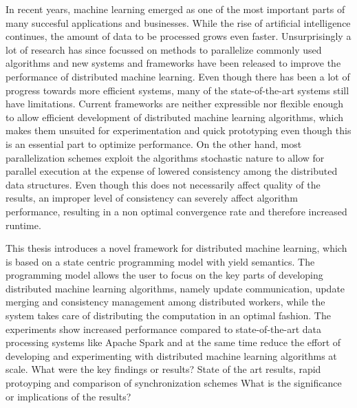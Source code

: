 % 
% 
%
In recent years, machine learning emerged as one of the most important parts of many succesful applications and businesses.
While the rise of artificial intelligence continues, the amount of data to be processed grows even faster.
Unsurprisingly a lot of research has since focussed on methods to parallelize commonly used algorithms and new systems and frameworks have been released to improve the performance of distributed machine learning.
Even though there has been a lot of progress towards more efficient systems, many of the state-of-the-art systems still have limitations.
Current frameworks are neither expressible nor flexible enough to allow efficient development of distributed machine learning algorithms, which makes them unsuited for experimentation and quick prototyping even though this is an essential part to optimize performance.
On the other hand, most parallelization schemes exploit the algorithms stochastic nature to allow for parallel execution at the expense of lowered consistency among the distributed data structures.
Even though this does not necessarily affect quality of the results, an improper level of consistency can severely affect algorithm performance, resulting in a non optimal convergence rate and therefore increased runtime.

This thesis introduces a novel framework for distributed machine learning, which is based on a state centric programming model with yield semantics.
The programming model allows the user to focus on the key parts of developing distributed machine learning algorithms, namely update communication, update merging and consistency management among distributed workers, while the system takes care of distributing the computation in an optimal fashion.
The experiments show increased performance compared to state-of-the-art data processing systems like Apache Spark and at the same time reduce the effort of developing and experimenting with distributed machine learning algorithms at scale.
What were the key findings or results?
State of the art results, rapid protoyping and comparison of synchronization schemes
What is the significance or implications of the results?

